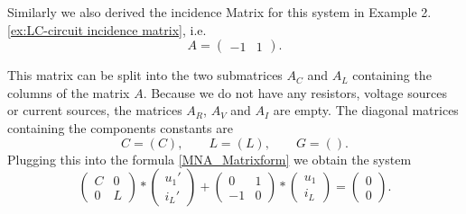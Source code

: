 \begin{example2}[LC-Circuit]
	\label{ex:LC-circuit MNA}
	Similarly we also derived the incidence Matrix for this system in Example 2.\ref{ex:LC-circuit incidence matrix}, i.e.
	\begin{displaymath}
		A = 
		\left(
		\begin{matrix}
			-1 & 1  
		\end{matrix}
		\right).
	\end{displaymath}
	
	This matrix can be split into the two submatrices $A_C$ and $A_L$ containing the columns of the matrix $A$. Because we do not have any resistors, voltage sources or current sources, the matrices $A_R$, $A_V$ and $A_I$ are empty. The diagonal matrices containing the components constants are
	\begin{displaymath}
		C = (C), \qquad L = (L), \qquad G=().
	\end{displaymath}
	Plugging this into the formula \eqref{MNA_Matrixform} we obtain the system
	\begin{displaymath}
		\begin{pmatrix}
			C & 0 \\
			0 & L 
		\end{pmatrix}
		*
		\begin{pmatrix}
			u_1' \\
			i_L'
		\end{pmatrix}
		+
		\begin{pmatrix}
			0 & 1 \\
			-1 & 0
		\end{pmatrix}
		*
		\begin{pmatrix}
			u_1 \\
			i_L
		\end{pmatrix}
		=
		\begin{pmatrix}
			0 \\
			0 
		\end{pmatrix}.
	\end{displaymath}
\end{example2}


